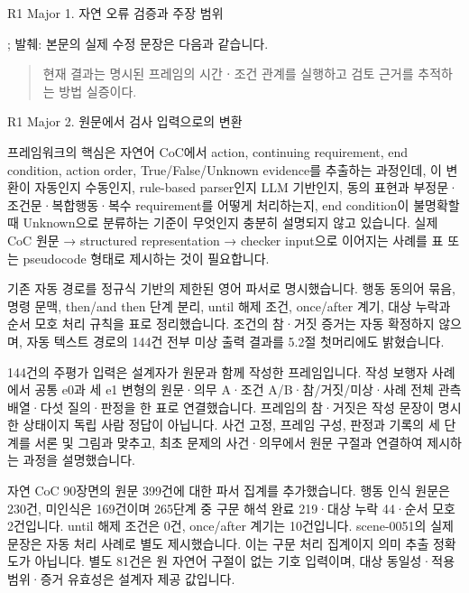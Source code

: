 \begin{reviewitem}{R1 Major 1. 자연 오류 검증과 주장 범위}
\begin{authorresponse}
\end{authorresponse}

\begin{manuscriptrevision}{; 발췌: }
본문의 실제 수정 문장은 다음과 같습니다.

\begin{quote}
현재 결과는 명시된 프레임의 시간ㆍ조건 관계를 실행하고 검토 근거를 추적하는 방법 실증이다.
\end{quote}
\end{manuscriptrevision}

\end{reviewitem}

\clearpage

\begin{reviewitem}{R1 Major 2. 원문에서 검사 입력으로의 변환}

\begin{reviewercomment}

프레임워크의 핵심은 자연어 CoC에서 action, continuing requirement, end condition, action order, True/False/Unknown evidence를 추출하는 과정인데, 이 변환이 자동인지 수동인지, rule-based parser인지 LLM 기반인지, 동의 표현과 부정문·조건문·복합행동·복수 requirement를 어떻게 처리하는지, end condition이 불명확할 때 Unknown으로 분류하는 기준이 무엇인지 충분히 설명되지 않고 있습니다. 실제 CoC 원문 → structured representation → checker input으로 이어지는 사례를 표 또는 pseudocode 형태로 제시하는 것이 필요합니다.

\end{reviewercomment}

\begin{authorresponse}

기존 자동 경로를 정규식 기반의 제한된 영어 파서로 명시했습니다. 행동 동의어 묶음, 명령 문맥, then/and then 단계 분리, until 해제 조건, once/after 계기, 대상 누락과 순서 모호 처리 규칙을 표로 정리했습니다. 조건의 참·거짓 증거는 자동 확정하지 않으며, 자동 텍스트 경로의 144건 전부 미상 출력 결과를 5.2절 첫머리에도 밝혔습니다.

144건의 주평가 입력은 설계자가 원문과 함께 작성한 프레임입니다. 작성 보행자 사례에서 공통 e0과 세 e1 변형의 원문·의무 A·조건 A/B·참/거짓/미상·사례 전체 관측 배열·다섯 질의·판정을 한 표로 연결했습니다. 프레임의 참·거짓은 작성 문장이 명시한 상태이지 독립 사람 정답이 아닙니다. 사건 고정, 프레임 구성, 판정과 기록의 세 단계를 서론 및 그림과 맞추고, 최초 문제의 사건·의무에서 원문 구절과 연결하여 제시하는 과정을 설명했습니다.

자연 CoC 90장면의 원문 399건에 대한 파서 집계를 추가했습니다. 행동 인식 원문은 230건, 미인식은 169건이며 265단계 중 구문 해석 완료 219·대상 누락 44·순서 모호 2건입니다. until 해제 조건은 0건, once/after 계기는 10건입니다. scene-0051의 실제 문장은 자동 처리 사례로 별도 제시했습니다. 이는 구문 처리 집계이지 의미 추출 정확도가 아닙니다. 별도 81건은 원 자연어 구절이 없는 기호 입력이며, 대상 동일성·적용 범위·증거 유효성은 설계자 제공 값입니다.


\end{authorresponse}
\end{reviewitem}
